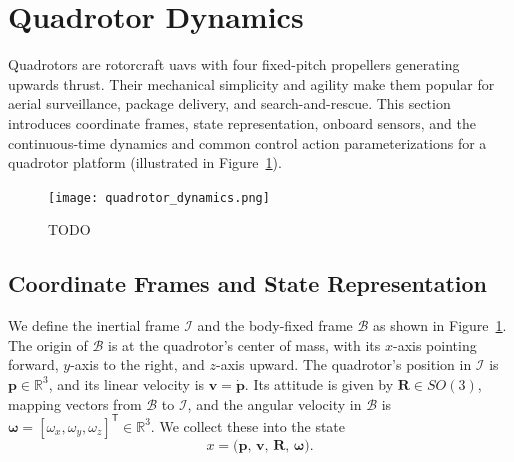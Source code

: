 \section{Quadrotor Dynamics}
\label{sec:quadrotor_control}
Quadrotors are rotorcraft \glspl{uav} with four fixed-pitch propellers generating upwards thrust. Their mechanical simplicity and agility make them popular for aerial surveillance, package delivery, and search-and-rescue. This section introduces coordinate frames, state representation, onboard sensors, and the continuous-time dynamics and common control action parameterizations for a quadrotor platform (illustrated in Figure~\ref{fig:quadrotor_frames}).
\begin{figure}[t]
  \centering
  \texttt{[image: quadrotor\_dynamics.png]}
  \caption[Quadrotor fundamentals]{TODO}
  \label{fig:quadrotor_frames}
\end{figure}

\subsection{Coordinate Frames and State Representation}
\label{sec:quadrotor_state}
We define the inertial frame \(\mathcal{I}\) and the body-fixed frame \(\mathcal{B}\) as shown in Figure~\ref{fig:quadrotor_frames}. The origin of \(\mathcal{B}\) is at the quadrotor's center of mass, with its \(x\)-axis pointing forward, \(y\)-axis to the right, and \(z\)-axis upward. The quadrotor's position in \(\mathcal{I}\) is \(\mathbf{p} \in \mathbb{R}^3\), and its linear velocity is \(\mathbf{v} = \dot{\mathbf{p}}\). Its attitude is given by \(\mathbf{R} \in SO(3)\), mapping vectors from \(\mathcal{B}\) to \(\mathcal{I}\), and the angular velocity in \(\mathcal{B}\) is \(\boldsymbol{\omega} = [\omega_x,\omega_y,\omega_z]^\mathsf{T} \in \mathbb{R}^3\). We collect these into the state
\begin{equation}
x = \bigl(\mathbf{p},\,\mathbf{v},\,\mathbf{R},\,\boldsymbol{\omega}\bigr).
\end{equation}

